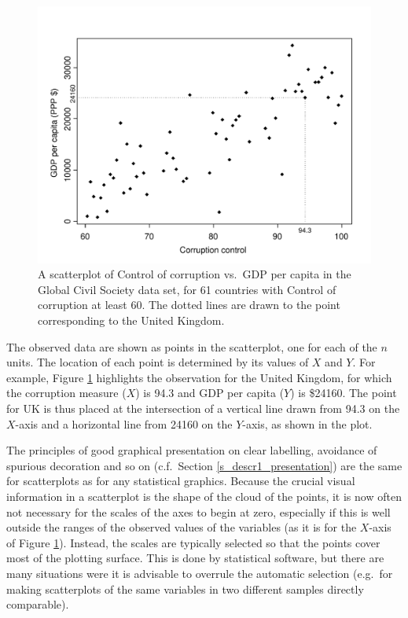 \begin{figure}
\caption{A scatterplot of Control of corruption vs.\ GDP per capita in
the Global Civil Society data set, for 61 countries with Control of
corruption at least 60. The dotted lines are drawn to the point
corresponding to the
United Kingdom.}
\label{f_corruption1}

\includegraphics[width=14cm]{corruption1}

\end{figure}

The observed data are shown as points in the scatterplot, one for each
of the $n$ units. The location of each point is determined by its values
of $X$ and $Y$. For example, Figure \ref{f_corruption1} highlights the
observation for the United Kingdom, for which the corruption measure
($X$) is 94.3 and GDP per capita ($Y$) is \$24160. The point for UK is
thus placed at the intersection of a vertical line drawn from 94.3 on
the $X$-axis and a horizontal line from 24160 on the $Y$-axis, as shown
in the plot.

The principles of good graphical presentation on clear labelling,
avoidance of spurious decoration and so on (c.f.\ Section
\ref{s_descr1_presentation}) are the same for scatterplots as for any
statistical graphics. Because the crucial visual information in a
scatterplot is the shape of the cloud of the points, it is now often not
necessary for the scales of the axes to begin at zero, especially if
this is well outside the ranges of the observed values of the variables
(as it is for the $X$-axis of Figure \ref{f_corruption1}). Instead, the
scales are typically selected so that the points cover most of the
plotting surface. This is done by statistical software,
but there are many situations were it is advisable to overrule the
automatic selection (e.g.\ for making scatterplots of the same variables
in two different samples directly comparable).

